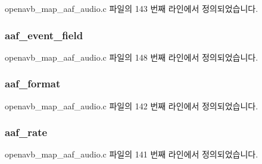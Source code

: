 openavb\+\_\+map\+\_\+aaf\+\_\+audio.\+c 파일의 143 번째 라인에서 정의되었습니다.

\subsubsection[{\texorpdfstring{aaf\+\_\+event\+\_\+field}{aaf_event_field}}]{ aaf\+\_\+event\+\_\+field}\hypertarget{structpvt__data__t_a14f1c7db26854a3afc01ce3b520d39d6}{}\label{structpvt__data__t_a14f1c7db26854a3afc01ce3b520d39d6}


openavb\+\_\+map\+\_\+aaf\+\_\+audio.\+c 파일의 148 번째 라인에서 정의되었습니다.

\subsubsection[{\texorpdfstring{aaf\+\_\+format}{aaf_format}}]{ aaf\+\_\+format}\hypertarget{structpvt__data__t_a407e79e5b561d63cf495a7f741733ab3}{}\label{structpvt__data__t_a407e79e5b561d63cf495a7f741733ab3}


openavb\+\_\+map\+\_\+aaf\+\_\+audio.\+c 파일의 142 번째 라인에서 정의되었습니다.

\subsubsection[{\texorpdfstring{aaf\+\_\+rate}{aaf_rate}}]{ aaf\+\_\+rate}\hypertarget{structpvt__data__t_a1da6f43e98044ff49800aa2c470d56dc}{}\label{structpvt__data__t_a1da6f43e98044ff49800aa2c470d56dc}


openavb\+\_\+map\+\_\+aaf\+\_\+audio.\+c 파일의 141 번째 라인에서 정의되었습니다.

